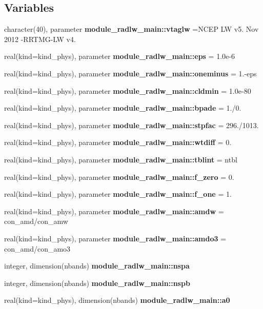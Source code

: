 \subsection*{Variables}
\begin{DoxyCompactItemize}
\item 
\mbox{\label{radlw__main_8f_a8d63a28d2550f8e193619e46a4c47d70}} 
character(40), parameter {\bfseries module\+\_\+radlw\+\_\+main\+::vtaglw} =\textquotesingle{}N\+C\+EP LW v5. Nov 2012 -\/R\+R\+T\+MG-\/LW v4. \textquotesingle{}
\item 
real(kind=kind\+\_\+phys), parameter {\bfseries module\+\_\+radlw\+\_\+main\+::eps} = 1.\+0e-\/6
\item 
real(kind=kind\+\_\+phys), parameter {\bfseries module\+\_\+radlw\+\_\+main\+::oneminus} = 1.-\/eps
\item 
real(kind=kind\+\_\+phys), parameter {\bfseries module\+\_\+radlw\+\_\+main\+::cldmin} = 1.\+0e-\/80
\item 
real(kind=kind\+\_\+phys), parameter {\bfseries module\+\_\+radlw\+\_\+main\+::bpade} = 1./0.
\item 
real(kind=kind\+\_\+phys), parameter {\bfseries module\+\_\+radlw\+\_\+main\+::stpfac} = 296./1013.
\item 
real(kind=kind\+\_\+phys), parameter {\bfseries module\+\_\+radlw\+\_\+main\+::wtdiff} = 0.
\item 
real(kind=kind\+\_\+phys), parameter {\bfseries module\+\_\+radlw\+\_\+main\+::tblint} = ntbl
\item 
real(kind=kind\+\_\+phys), parameter {\bfseries module\+\_\+radlw\+\_\+main\+::f\+\_\+zero} = 0.
\item 
real(kind=kind\+\_\+phys), parameter {\bfseries module\+\_\+radlw\+\_\+main\+::f\+\_\+one} = 1.
\item 
real(kind=kind\+\_\+phys), parameter {\bfseries module\+\_\+radlw\+\_\+main\+::amdw} = con\+\_\+amd/con\+\_\+amw
\item 
real(kind=kind\+\_\+phys), parameter {\bfseries module\+\_\+radlw\+\_\+main\+::amdo3} = con\+\_\+amd/con\+\_\+amo3
\item 
integer, dimension(nbands) {\bfseries module\+\_\+radlw\+\_\+main\+::nspa}
\item 
integer, dimension(nbands) {\bfseries module\+\_\+radlw\+\_\+main\+::nspb}
\item 
real(kind=kind\+\_\+phys), dimension(nbands) {\bfseries module\+\_\+radlw\+\_\+main\+::a0}

\end{DoxyCompactItemize}
